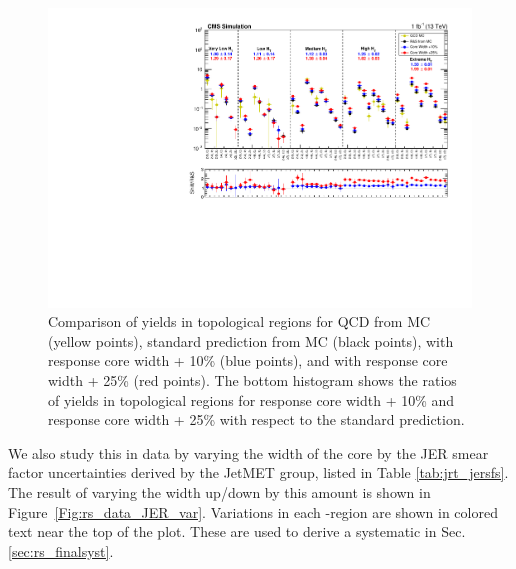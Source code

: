 \begin{figure}[htp]
  \begin{center}
    \includegraphics[width=1.0\textwidth]{figs/qcd/rs_mc/mc_coreWidth.pdf}
    \caption{Comparison of yields in topological regions for QCD from MC (yellow points), standard \rs prediction from MC (black points), \rs with response core width + 10\% (blue points), and
             \rs with response core width + 25\% (red points). The bottom histogram shows the ratios of yields in topological regions for response core width + 10\% and response core width + 25\%
             with respect to the standard \rs prediction.
            }
    \label{Fig:rs_modify_core}
  \end{center}
\end{figure}

We also study this in data by varying the width of the core by the JER smear factor uncertainties derived by the JetMET group, listed in Table \ref{tab:jrt_jersfs}.
The result of varying the width up/down by this amount is shown in Figure~\ref{Fig:rs_data_JER_var}. Variations in each \Ht-region are shown in colored text near
the top of the plot. These are used to derive a systematic in Sec. \ref{sec:rs_finalsyst}.

